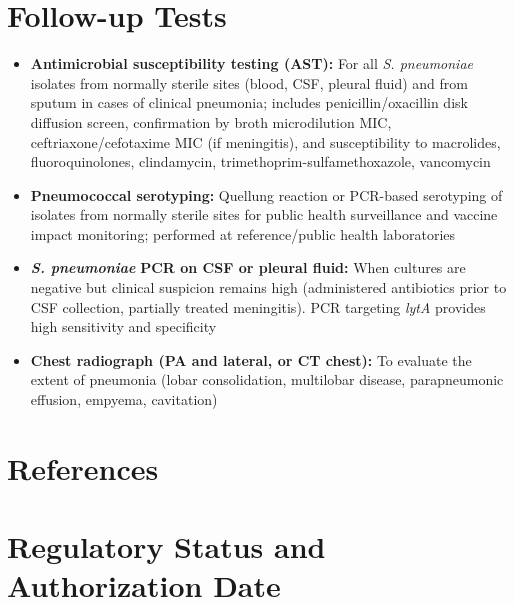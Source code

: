 \section*{Follow-up Tests}
\begin{itemize}
  \item \textbf{Antimicrobial susceptibility testing (AST):} For all \textit{S. pneumoniae} isolates from normally sterile sites (blood, CSF, pleural fluid) and from sputum in cases of clinical pneumonia; includes penicillin/oxacillin disk diffusion screen, confirmation by broth microdilution MIC, ceftriaxone/cefotaxime MIC (if meningitis), and susceptibility to macrolides, fluoroquinolones, clindamycin, trimethoprim-sulfamethoxazole, vancomycin
  \item \textbf{Pneumococcal serotyping:} Quellung reaction or PCR-based serotyping of isolates from normally sterile sites for public health surveillance and vaccine impact monitoring; performed at reference/public health laboratories
  \item \textit{\textbf{S. pneumoniae}} \textbf{PCR on CSF or pleural fluid:} When cultures are negative but clinical suspicion remains high (administered antibiotics prior to CSF collection, partially treated meningitis). PCR targeting \textit{lytA} provides high sensitivity and specificity
  \item \textbf{Chest radiograph (PA and lateral, or CT chest):} To evaluate the extent of pneumonia (lobar consolidation, multilobar disease, parapneumonic effusion, empyema, cavitation)
\end{itemize}

\section*{References}



\clearpage
\section*{Regulatory Status and Authorization Date}

\clearpage
